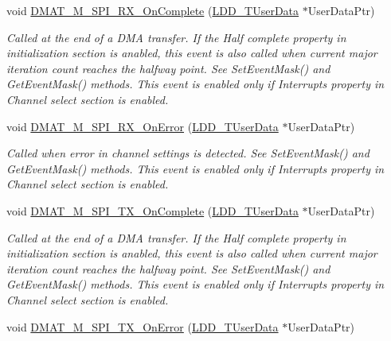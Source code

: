 \begin{DoxyCompactItemize}
\item 
void \hyperlink{group___events__module_ga31b7ba39777bc5353b7921bb262d12a4}{D\-M\-A\-T\-\_\-\-M\-\_\-\-S\-P\-I\-\_\-\-R\-X\-\_\-\-On\-Complete} (\hyperlink{group___p_e___types__module_ga0b66a73f87238a782318aa0be7578e35}{L\-D\-D\-\_\-\-T\-User\-Data} $\ast$User\-Data\-Ptr)
\begin{DoxyCompactList}\small\item\em Called at the end of a D\-M\-A transfer. If the Half complete property in initialization section is anabled, this event is also called when current major iteration count reaches the halfway point. See Set\-Event\-Mask() and Get\-Event\-Mask() methods. This event is enabled only if Interrupts property in Channel select section is enabled. \end{DoxyCompactList}\item 
void \hyperlink{group___events__module_gab11607160ff8e1edbe6197aec1b0b2c7}{D\-M\-A\-T\-\_\-\-M\-\_\-\-S\-P\-I\-\_\-\-R\-X\-\_\-\-On\-Error} (\hyperlink{group___p_e___types__module_ga0b66a73f87238a782318aa0be7578e35}{L\-D\-D\-\_\-\-T\-User\-Data} $\ast$User\-Data\-Ptr)
\begin{DoxyCompactList}\small\item\em Called when error in channel settings is detected. See Set\-Event\-Mask() and Get\-Event\-Mask() methods. This event is enabled only if Interrupts property in Channel select section is enabled. \end{DoxyCompactList}\item 
void \hyperlink{group___events__module_ga9d4a2ec96c400f79ae13781eb5dcf3e2}{D\-M\-A\-T\-\_\-\-M\-\_\-\-S\-P\-I\-\_\-\-T\-X\-\_\-\-On\-Complete} (\hyperlink{group___p_e___types__module_ga0b66a73f87238a782318aa0be7578e35}{L\-D\-D\-\_\-\-T\-User\-Data} $\ast$User\-Data\-Ptr)
\begin{DoxyCompactList}\small\item\em Called at the end of a D\-M\-A transfer. If the Half complete property in initialization section is anabled, this event is also called when current major iteration count reaches the halfway point. See Set\-Event\-Mask() and Get\-Event\-Mask() methods. This event is enabled only if Interrupts property in Channel select section is enabled. \end{DoxyCompactList}\item 
void \hyperlink{group___events__module_ga8d43f53c81d3fbbee3bd6ab11d5bd3d9}{D\-M\-A\-T\-\_\-\-M\-\_\-\-S\-P\-I\-\_\-\-T\-X\-\_\-\-On\-Error} (\hyperlink{group___p_e___types__module_ga0b66a73f87238a782318aa0be7578e35}{L\-D\-D\-\_\-\-T\-User\-Data} $\ast$User\-Data\-Ptr)

\end{DoxyCompactItemize}
